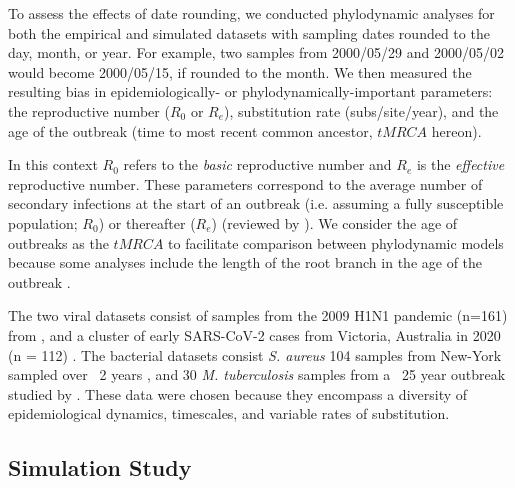 \documentclass{article}
\begin{document}
\begin{spacing}{1.5}
To assess the effects of date rounding, we conducted phylodynamic analyses for both the empirical and simulated datasets with sampling dates rounded to the day, month, or year. For example, two samples from 2000/05/29 and 2000/05/02 would become 2000/05/15, if rounded to the month. We then measured the resulting bias in epidemiologically- or phylodynamically-important parameters: the reproductive number ($R_0$ or $R_e$), substitution rate (subs/site/year), and the age of the outbreak (time to most recent common ancestor, $tMRCA$ hereon). 

In this context $R_0$ refers to the \textit{basic} reproductive number and $R_e$ is the \textit{effective} reproductive number. These parameters correspond to the average number of secondary infections at the start of an outbreak (i.e. assuming a fully susceptible population; $R_0$) or thereafter ($R_e$) (reviewed by \citep{featherstone2022epidemiological, du2015getting, kuhnert2011phylogenetic}). We consider the age of outbreaks as the $tMRCA$ to facilitate comparison between phylodynamic models because some analyses include the length of the root branch in the age of the outbreak \citep{stadler2012estimating}.

The two viral datasets consist of samples from the 2009 H1N1 pandemic (n=161) from \citet{hedge_2013_real-time}, and a cluster of early SARS-CoV-2 cases from  Victoria, Australia in 2020 (n = 112) \citep{lane2021genomics}. The bacterial datasets consist \textit{S. aureus} 104 samples from New-York sampled over ~2 years \citet{duchene_2016_genome,volz_modeling_2018,uhlemann_molecular_2014}, and 30 \textit{M. tuberculosis} samples from a ~25 year outbreak studied by \citet{kuhnert_tuberculosis_2018}. These data were chosen because they encompass a diversity of epidemiological dynamics, timescales, and variable rates of substitution.

\subsection*{Simulation Study}


\end{spacing}
\end{document}
